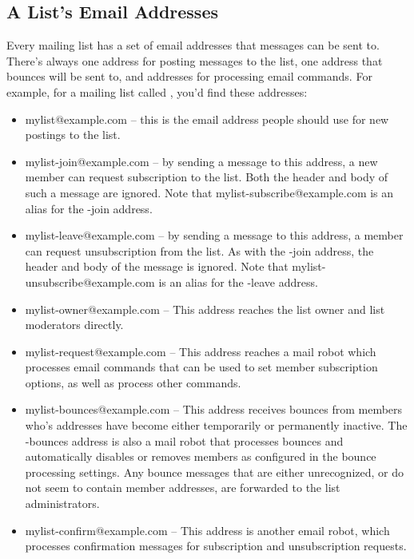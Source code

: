 \documentclass{howto}
\begin{document}
\subsection{A List's Email Addresses}

Every mailing list has a set of email addresses that messages can be
sent to.  There's always one address for posting messages to the list,
one address that bounces will be sent to, and addresses for processing
email commands.  For example, for a mailing list called
, you'd find these addresses:

\begin{itemize}
\item mylist@example.com -- this is the email address people should
      use for new postings to the list.

\item mylist-join@example.com -- by sending a message to this address,
      a new member can request subscription to the list.  Both the
       header and body of such a message are
      ignored.  Note that mylist-subscribe@example.com is an alias for
      the -join address.

\item mylist-leave@example.com -- by sending a message to this address,
      a member can request unsubscription from the list.  As with the
      -join address, the  header and body of the
      message is ignored.  Note that mylist-unsubscribe@example.com is
      an alias for the -leave address.

\item mylist-owner@example.com -- This address reaches the list owner
      and list moderators directly.

\item mylist-request@example.com -- This address reaches a mail robot
      which processes email commands that can be used to set member
      subscription options, as well as process other commands.

\item mylist-bounces@example.com -- This address receives bounces from
      members who's addresses have become either temporarily or
      permanently inactive.  The -bounces address is also a mail robot
      that processes bounces and automatically disables or removes
      members as configured in the bounce processing settings.  Any
      bounce messages that are either unrecognized, or do not seem to
      contain member addresses, are forwarded to the list
      administrators.

\item mylist-confirm@example.com -- This address is another email
      robot, which processes confirmation messages for subscription
      and unsubscription requests.
\end{itemize}
\end{document}
